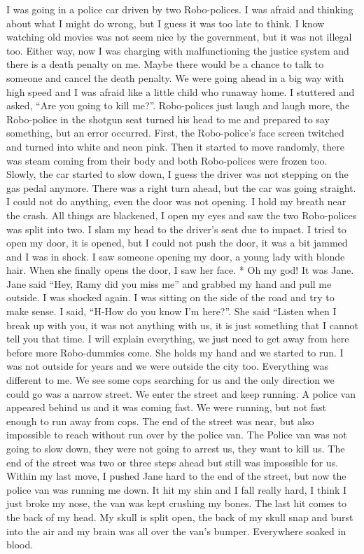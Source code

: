 \documentclass[]{book}
\begin{document}
I was going in a police car driven by two Robo-polices. I was afraid and thinking about what I might do wrong, but I guess it was too late to think. I know watching old movies was not seem nice by the government, but it was not illegal too. Either way, now I was charging with malfunctioning the justice system and there is a death penalty on me. Maybe there would be a chance to talk to someone and cancel the death penalty. We were going ahead in a big way with high speed and I was afraid like a little child who runaway home. I stuttered and asked, ``Are you going to kill me?''. Robo-polices just laugh and laugh more, the Robo-police in the shotgun seat turned his head to me and prepared to say something, but an error occurred. First, the Robo-police's face screen twitched and turned into white and neon pink. Then it started to move randomly, there was steam coming from their body and both Robo-polices were frozen too. Slowly, the car started to slow down, I guess the driver was not stepping on the gas pedal anymore. There was a right turn ahead, but the car was going straight. I could not do anything, even the door was not opening. I hold my breath near the crash. All things are blackened, I open my eyes and saw the two Robo-polices was split into two. I slam my head to the driver's seat due to impact. I tried to open my door, it is opened, but I could not push the door, it was a bit jammed and I was in shock. I saw someone opening my door, a young lady with blonde hair. When she finally opens the door, I saw her face.
* Oh my god! It was Jane. Jane said ``Hey, Ramy did you miss me'' and grabbed my hand and pull me outside. I was shocked again. I was sitting on the side of the road and try to make sense. I said, ``H-How do you know I'm here?''. She said ``Listen when I break up with you, it was not anything with us, it is just something that I cannot tell you that time. I will explain everything, we just need to get away from here before more Robo-dummies come. She holds my hand and we started to run. I was not outside for years and we were outside the city too. Everything was different to me. We see some cops searching for us and the only direction we could go was a narrow street. We enter the street and keep running. A police van appeared behind us and it was coming fast. We were running, but not fast enough to run away from cops. The end of the street was near, but also impossible to reach without run over by the police van. The Police van was not going to slow down, they were not going to arrest us, they want to kill us. The end of the street was two or three steps ahead but still was impossible for us. Within my last move, I pushed Jane hard to the end of the street, but now the police van was running me down. It hit my shin and I fall really hard, I think I just broke my nose, the van was kept crushing my bones. The last hit comes to the back of my head. My skull is split open, the back of my skull snap and burst into the air and my brain was all over the van's bumper. Everywhere soaked in blood.
\end{document}
